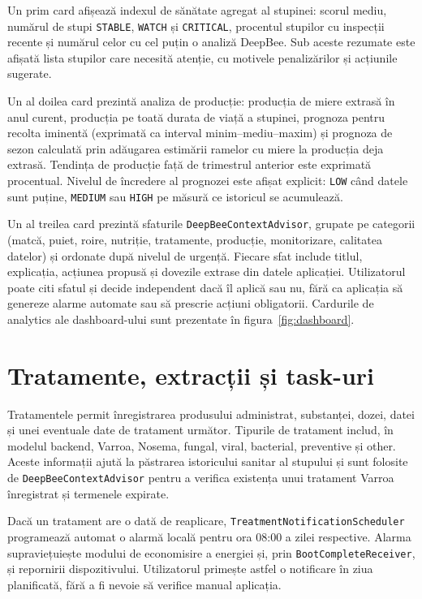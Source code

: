Un prim card afișează indexul de sănătate agregat al stupinei: scorul mediu, numărul de stupi \texttt{STABLE}, \texttt{WATCH} și \texttt{CRITICAL}, procentul stupilor cu inspecții recente și numărul celor cu cel puțin o analiză DeepBee. Sub aceste rezumate este afișată lista stupilor care necesită atenție, cu motivele penalizărilor și acțiunile sugerate.

Un al doilea card prezintă analiza de producție: producția de miere extrasă în anul curent, producția pe toată durata de viață a stupinei, prognoza pentru recolta iminentă (exprimată ca interval minim--mediu--maxim) și prognoza de sezon calculată prin adăugarea estimării ramelor cu miere la producția deja extrasă. Tendința de producție față de trimestrul anterior este exprimată procentual. Nivelul de încredere al prognozei este afișat explicit: \texttt{LOW} când datele sunt puține, \texttt{MEDIUM} sau \texttt{HIGH} pe măsură ce istoricul se acumulează.

Un al treilea card prezintă sfaturile \texttt{DeepBeeContextAdvisor}, grupate pe categorii (matcă, puiet, roire, nutriție, tratamente, producție, monitorizare, calitatea datelor) și ordonate după nivelul de urgență. Fiecare sfat include titlul, explicația, acțiunea propusă și dovezile extrase din datele aplicației. Utilizatorul poate citi sfatul și decide independent dacă îl aplică sau nu, fără ca aplicația să genereze alarme automate sau să prescrie acțiuni obligatorii. Cardurile de analytics ale dashboard-ului sunt prezentate în figura~\ref{fig:dashboard}.


\section{Tratamente, extracții și task-uri}

Tratamentele permit înregistrarea produsului administrat, substanței, dozei, datei și unei eventuale date de tratament următor. Tipurile de tratament includ, în modelul backend, Varroa, Nosema, fungal, viral, bacterial, preventive și other. Aceste informații ajută la păstrarea istoricului sanitar al stupului și sunt folosite de \texttt{DeepBeeContextAdvisor} pentru a verifica existența unui tratament Varroa înregistrat și termenele expirate.

Dacă un tratament are o dată de reaplicare, \texttt{TreatmentNotificationScheduler} programează automat o alarmă locală pentru ora 08:00 a zilei respective. Alarma supraviețuiește modului de economisire a energiei și, prin \texttt{BootCompleteReceiver}, și repornirii dispozitivului. Utilizatorul primește astfel o notificare în ziua planificată, fără a fi nevoie să verifice manual aplicația.

